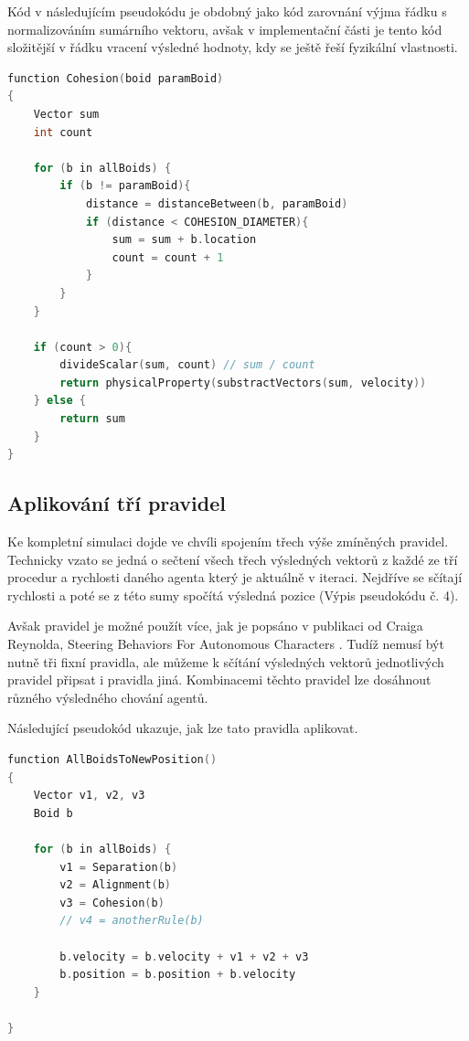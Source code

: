 \documentclass[czech,public,dept460,male,cpdeclaration]{diploma}
\begin{document}
Kód v následujícím pseudokódu je obdobný jako kód zarovnání výjma řádku s normalizováním sumárního vektoru, avšak v implementační části je tento kód složitější v řádku vracení výsledné hodnoty, kdy se ještě řeší fyzikální vlastnosti.

\begin{lstlisting}[language=c++,label=src:Cohesion pseudocode,caption=Pseudokód pro kohezi]
function Cohesion(boid paramBoid)
{	
	Vector sum
	int count
	
	for (b in allBoids) {
		if (b != paramBoid){
			distance = distanceBetween(b, paramBoid)
			if (distance < COHESION_DIAMETER){
				sum = sum + b.location
				count = count + 1
			}
		}
	}
	
	if (count > 0){
		divideScalar(sum, count) // sum / count
		return physicalProperty(substractVectors(sum, velocity))
	} else {
		return sum
	}
}
\end{lstlisting}

\subsection{Aplikování tří pravidel}\label{sec:aplikovani-tri-pravidel}
Ke kompletní simulaci dojde ve chvíli spojením třech výše zmíněných pravidel. Technicky vzato se jedná o sečtení všech třech výsledných vektorů z každé ze tří procedur a rychlosti daného agenta který je aktuálně v iteraci. Nejdříve se sčítají rychlosti a poté se z této sumy spočítá výsledná pozice (Výpis pseudokódu č. 4).

Avšak pravidel je možné použít více, jak je popsáno v publikaci od Craiga Reynolda, Steering Behaviors For Autonomous Characters \cite{linkToSteeringBehaviors}. Tudíž nemusí být nutně tři fixní pravidla, ale můžeme k sčítání výsledných vektorů jednotlivých pravidel připsat i pravidla jiná. Kombinacemi těchto pravidel lze dosáhnout různého výsledného chování agentů.

Následující pseudokód ukazuje, jak lze tato pravidla aplikovat.

\begin{lstlisting}[language=c++,label=src:Flocking pseudocode,caption=Pseudokód pro aplikování třech pravidel]
function AllBoidsToNewPosition()
{
	Vector v1, v2, v3
	Boid b
	
	for (b in allBoids) {
		v1 = Separation(b)
		v2 = Alignment(b)
		v3 = Cohesion(b)
		// v4 = anotherRule(b)
		
		b.velocity = b.velocity + v1 + v2 + v3
		b.position = b.position + b.velocity
	}

}
\end{lstlisting}
\end{document}
